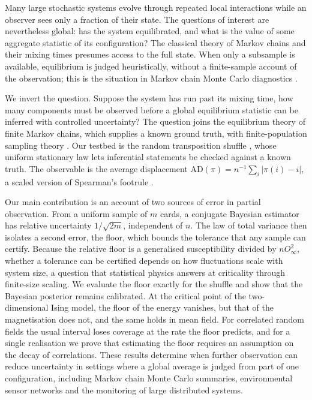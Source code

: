 \documentclass[ba,preprint]{imsart}
\theoremstyle{plain}
\theoremstyle{definition}
\newcommand{\AD}{\mathrm{AD}}
\begin{document}
Many large stochastic systems evolve through repeated local interactions while an observer sees only a fraction of their state. The questions of interest are nevertheless global: has the system equilibrated, and what is the value of some aggregate statistic of its configuration? The classical theory of Markov chains and their mixing times \citep{LevinPeresWilmer2009} presumes access to the full state. When only a subsample is available, equilibrium is judged heuristically, without a finite-sample account of the observation; this is the situation in Markov chain Monte Carlo diagnostics \citep{GelmanRubin1992}.

We invert the question. Suppose the system has run past its mixing time, how many components must be observed before a global equilibrium statistic can be inferred with controlled uncertainty? The question joins the equilibrium theory of finite Markov chains, which supplies a known ground truth, with finite-population sampling theory \citep{Cochran1977}. Our testbed is the random transposition shuffle \citep{DiaconisShahshahani1981}, whose uniform stationary law lets inferential statements be checked against a known truth. The observable is the average displacement $\AD(\pi)=n^{-1}\sum_i|\pi(i)-i|$, a scaled version of Spearman's footrule \citep{DiaconisGraham1977}.

Our main contribution is an account of two sources of error in partial observation. From a uniform sample of $m$ cards, a conjugate Bayesian estimator has relative uncertainty $1/\sqrt{2m}$, independent of $n$. The law of total variance then isolates a second error, the floor, which bounds the tolerance that any sample can certify. Because the relative floor is a generalised susceptibility divided by $nO_\infty^2$, whether a tolerance can be certified depends on how fluctuations scale with system size, a question that statistical physics answers at criticality through finite-size scaling. We evaluate the floor exactly for the shuffle and show that the Bayesian posterior remains calibrated. At the critical point of the two-dimensional Ising model, the floor of the energy vanishes, but that of the magnetisation does not, and the same holds in mean field. For correlated random fields the usual interval loses coverage at the rate the floor predicts, and for a single realisation we prove that estimating the floor requires an assumption on the decay of correlations. These results determine when further observation can reduce uncertainty in settings where a global average is judged from part of one configuration, including Markov chain Monte Carlo summaries, environmental sensor networks and the monitoring of large distributed systems.
\end{document}
